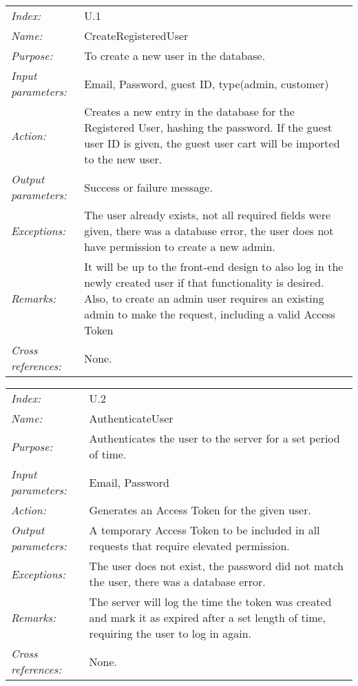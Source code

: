 \documentclass[10pt,letter]{article}
\begin{document}
\begin{tabularx}{\textwidth}{l X}
    \it{Index:} & U.1 \\
    \it{Name:} & CreateRegisteredUser \\
    \it{Purpose:} & To create a new user in the database. \\
    \it{Input parameters:} & Email, Password, guest ID, type(admin, customer)\\
    \it{Action:} & Creates a new entry in the database for the Registered User, hashing the password. If the guest 
    user ID is given, the guest user cart will be imported to the new user.\\
    \it{Output parameters:} & Success or failure message. \\
    \it{Exceptions:} & The user already exists, not all required fields were given, there 
    was a database error, the user does not have permission to create a new admin. \\
    \it{Remarks:} & It will be up to the front-end design to also log in the newly created 
    user if that functionality is desired. Also, to create an admin user requires an existing admin
    to make the request, including a valid Access Token\\
    \it{Cross references:} & None. \\
    \hline
\end{tabularx}

\begin{tabularx}{\textwidth}{l X}
    \it{Index:} & U.2 \\
    \it{Name:} & AuthenticateUser \\
    \it{Purpose:} & Authenticates the user to the server for a set period of time. \\
    \it{Input parameters:} & Email, Password \\
    \it{Action:} & Generates an Access Token for the given user. \\
    \it{Output parameters:} & A temporary Access Token to be included in all requests that require elevated permission. \\
    \it{Exceptions:} & The user does not exist, the password did not match the user, there was a database error. \\
    \it{Remarks:} & The server will log the time the token was created and mark it as expired after a set length of time, 
    requiring the user to log in again. \\
    \it{Cross references:} & None. \\
    \hline
\end{tabularx}
\end{document}
